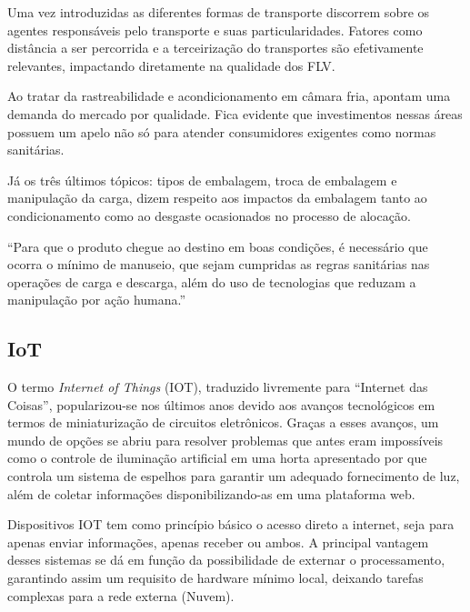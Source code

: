 Uma vez introduzidas as diferentes formas de transporte  discorrem sobre os agentes responsáveis pelo transporte e suas particularidades. Fatores como distância a ser percorrida e a terceirização do transportes são efetivamente relevantes, impactando diretamente na qualidade dos FLV.

Ao tratar da rastreabilidade e acondicionamento em câmara fria,  apontam uma demanda do mercado por qualidade. Fica evidente que investimentos nessas áreas possuem um apelo não só para atender consumidores exigentes como normas sanitárias.

Já os três últimos tópicos: tipos de embalagem, troca de embalagem e manipulação da carga, dizem respeito aos impactos da embalagem tanto ao condicionamento como ao desgaste ocasionados no processo de alocação.

``Para que o produto chegue ao destino em boas condições, é necessário que ocorra o mínimo de manuseio, que sejam cumpridas as regras sanitárias nas operações de carga e descarga, além do uso de tecnologias que reduzam a manipulação por ação humana.'' \cite[p.~16]{Aliotte2022}





\subsection{IoT}
O termo \textit{Internet of Things} (IOT), traduzido livremente para ``Internet das Coisas'', popularizou-se nos últimos anos devido aos avanços tecnológicos em termos de miniaturização de circuitos eletrônicos. Graças a esses avanços, um mundo de opções se abriu para resolver problemas que antes eram impossíveis como o controle de iluminação artificial em uma horta apresentado por  que controla um sistema de espelhos para garantir um adequado fornecimento de luz, além de coletar informações disponibilizando-as em uma plataforma web.

Dispositivos IOT tem como princípio básico o acesso direto a internet, seja para apenas enviar informações, apenas receber ou ambos. A principal vantagem desses sistemas se dá em função da possibilidade de externar o processamento, garantindo assim um requisito de hardware mínimo local, deixando tarefas complexas para a rede externa (Nuvem).  

